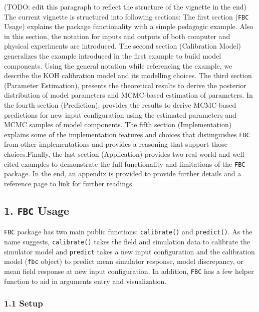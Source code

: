 \documentclass[
]{article}
\begin{document}
(TODO: edit this paragraph to reflect the structure of the vignette in
the end) The current vignette is structured into following sections: The
first section (\texttt{FBC} Usage) explains the package functionality
with a simple pedagogic example. Also in this section, the notation for
inputs and outputs of both computer and physical experiments are
introduced. The second section (Calibration Model) generalizes the
example introduced in the first example to build model components. Using
the general notation while referencing the example, we describe the KOH
calibration model and its modelling choices. The third section
(Parameter Estimation), presents the theoretical results to derive the
posterior distribution of model parameters and MCMC-based estimation of
parameters. In the fourth section (Prediction), provides the results to
derive MCMC-based predictions for new input configuration using the
estimated parameters and MCMC samples of model components. The fifth
section (Implementation) explains some of the implementation features
and choices that distinguishes \texttt{FBC} from other implementations
and provides a reasoning that support those choices.Finally, the last
section (Application) provides two real-world and well-cited examples to
demonstrate the full functionality and limitations of the \texttt{FBC}
package. In the end, an appendix is provided to provide further details
and a reference page to link for further readings.

\pagebreak

\hypertarget{fbc-usage}{%
\subsection{\texorpdfstring{1. \texttt{FBC}
Usage}{1. FBC Usage}}\label{fbc-usage}}

\texttt{FBC} package has two main public functions: \texttt{calibrate()}
and \texttt{predict()}. As the name suggests, \texttt{calibrate()} takes
the field and simulation data to calibrate the simulator model and
\texttt{predict} takes a new input configuration and the calibration
model (\texttt{fbc} object) to predict mean simulator response, model
discrepancy, or mean field response at new input configuration. In
addition, \texttt{FBC} has a few helper function to aid in arguments
entry and visualization.

\hypertarget{setup}{%
\subsubsection{1.1 Setup}\label{setup}}
\end{document}
